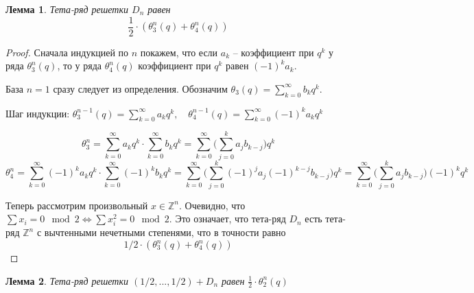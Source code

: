 \documentclass{article}
\newcommand{\ZZ}{\mathbb{Z}}
\theoremstyle{break}
\newtheorem{lemma}{Лемма}[section]
\begin{document}
\begin{lemma}
	Тета-ряд решетки $D_n$ равен 
	\begin{equation}
		\frac{1}{2} \cdot (\theta_3^n(q) + \theta_4^n(q))
	\end{equation}
\end{lemma}

\begin{proof}
	Сначала индукцией по $n$ покажем, что если $a_k$ -- коэффициент при $q^k$ у ряда $\theta_{3}^n(q)$, то у ряда $\theta_{4}^n(q)$ коэффициент при $q^k$ равен 
	$(-1)^k a_k$.
	
	База $n=1$ сразу следует из определения. Обозначим
	 $\theta_{3}(q)=\sum_{k=0}^\infty b_k q^k$. 
	
	Шаг индукции: $\theta_{3}^{n-1}(q) = \sum_{k=0}^\infty a_k q^k,
	\quad \theta_{4}^{n-1}(q)=\sum_{k=0}^\infty (-1)^k a_k q^k$
	
	\begin{equation}
		\theta_{3}^{n} = \sum_{k=0}^\infty a_k q^k \cdot \sum_{k = 0}^\infty b_k q^k = 
		\sum_{k = 0}^\infty \Big( \sum_{j=0}^k a_j b_{k-j} \Big) q^k
	\end{equation}
	\begin{equation}
			\theta_{4}^{n} = \sum_{k=0}^\infty (-1)^k a_k q^k \cdot \sum_{k = 0}^\infty (-1)^k b_k q^k = 
	\sum_{k = 0}^\infty \Big(  \sum_{j=0}^k (-1)^j a_j (-1)^{k-j} b_{k-j} \Big) q^k =
	\sum_{k = 0}^\infty \Big( \sum_{j=0}^k a_j b_{k-j} \Big) (-1)^k q^k
	\end{equation}
	
	Теперь рассмотрим произвольный $x \in \ZZ^n$. Очевидно, что 
	$\sum x_i = 0 \mod 2 \iff \sum x_i^2 = 0 \mod 2$. 
	Это означает, что тета-ряд $D_n$ есть тета-ряд $\ZZ^n$ с вычтенными нечетными степенями, что в точности равно \begin{equation}1/2 \cdot (\theta_3^n (q) + \theta_4 ^n (q))\end{equation}
\end{proof}

\begin{lemma}
	Тета-ряд решетки $(1/2, ..., 1/2) + D_n$ равен 
	$
	\frac{1}{2} \cdot \theta_{2}^n (q)
	$
\end{lemma}
\end{document}
